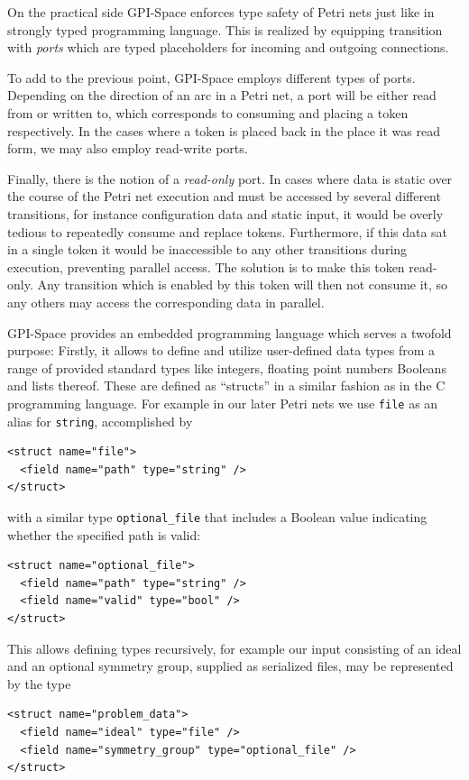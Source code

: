 \documentclass[
  paper=a4,
  titlepage,
  bibliography=totoc,
  listof=totoc,
  pagesize=pdftex
]{scrartcl}
\numberwithin{figure}{section}
\numberwithin{equation}{section}
\numberwithin{table}{section}
\theoremstyle{definition}
\numberwithin{definition}{section}
\begin{document}
\begin{description}[leftmargin=\parindent]
    On the practical side GPI-Space enforces type safety of Petri nets just like in
    strongly typed programming language. This is realized by equipping transition with
    \emph{ports} which are typed placeholders for incoming and outgoing connections.
  \item[Read-only ports:] To add to the previous point, GPI-Space employs different types
    of ports. Depending on the direction of an arc in a Petri net, a port will be either
    read from or written to, which corresponds to consuming and placing a token
    respectively. In the cases where a token is placed back in the place it was read form,
    we may also employ read-write ports.

    Finally, there is the notion of a \emph{read-only} port. In cases where data is static
    over the course of the Petri net execution and must be accessed by several different
    transitions, for instance configuration data and static input, it would be overly
    tedious to repeatedly consume and replace tokens. Furthermore, if this data sat in a
    single token it would be inaccessible to any other transitions during execution,
    preventing parallel access. The solution is to make this token read-only. Any
    transition which is enabled by this token will then not consume it, so any others may
    access the corresponding data in parallel.
  \item[Expression Language:] GPI-Space provides an embedded programming language which
    serves a twofold purpose: Firstly, it allows to define and utilize user-defined data
    types from a range of provided standard types like integers, floating point numbers
    Booleans and lists thereof. These are defined as \enquote{structs} in a similar
    fashion as in the C programming language. For example in our later Petri nets we use
    \texttt{file} as an alias for \texttt{string}, accomplished by
    \begin{verbatim}
<struct name="file">
  <field name="path" type="string" />
</struct>\end{verbatim}%
    with a similar type \texttt{optional\_file} that includes a Boolean value indicating
    whether the specified path is valid:
    \begin{verbatim}
<struct name="optional_file">
  <field name="path" type="string" />
  <field name="valid" type="bool" />
</struct>\end{verbatim}%
    This allows defining types recursively, for example our input consisting of an ideal
    and an optional symmetry group, supplied as serialized files, may be represented by
    the type
    \begin{verbatim}
<struct name="problem_data">
  <field name="ideal" type="file" />
  <field name="symmetry_group" type="optional_file" />
</struct>\end{verbatim}%


\end{description}
\end{document}
